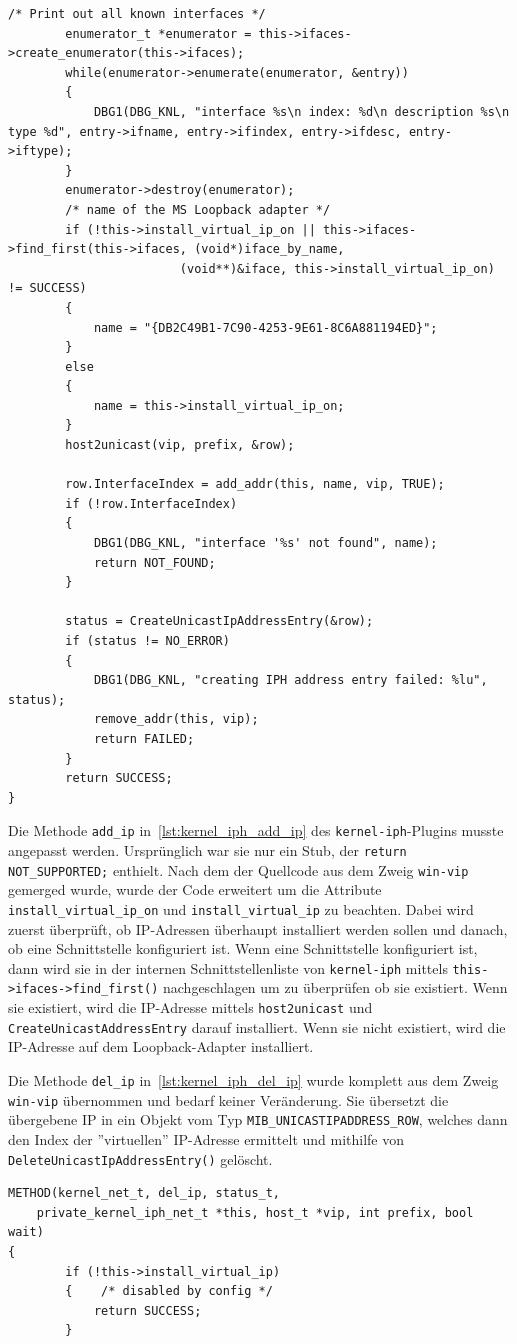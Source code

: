{\begin{lstlisting}[caption=Code für add\_ip,label=lst:kernel_iph_add_ip]
        /* Print out all known interfaces */
        enumerator_t *enumerator = this->ifaces->create_enumerator(this->ifaces);
        while(enumerator->enumerate(enumerator, &entry))
        {
            DBG1(DBG_KNL, "interface %s\n index: %d\n description %s\n type %d", entry->ifname, entry->ifindex, entry->ifdesc, entry->iftype);
        }
        enumerator->destroy(enumerator);
        /* name of the MS Loopback adapter */
        if (!this->install_virtual_ip_on || this->ifaces->find_first(this->ifaces, (void*)iface_by_name,
                        (void**)&iface, this->install_virtual_ip_on) != SUCCESS)
        {
            name = "{DB2C49B1-7C90-4253-9E61-8C6A881194ED}";
        }
        else
        {
            name = this->install_virtual_ip_on;
        }
        host2unicast(vip, prefix, &row);

        row.InterfaceIndex = add_addr(this, name, vip, TRUE);
        if (!row.InterfaceIndex)
        {
            DBG1(DBG_KNL, "interface '%s' not found", name);
            return NOT_FOUND;
        }

        status = CreateUnicastIpAddressEntry(&row);
        if (status != NO_ERROR)
        {
            DBG1(DBG_KNL, "creating IPH address entry failed: %lu", status);
            remove_addr(this, vip);
            return FAILED;
        }
        return SUCCESS;
}
\end{lstlisting}

Die Methode \texttt{add\_ip} in~\autoref{lst:kernel_iph_add_ip} des \texttt{kernel-iph}-Plugins musste angepasst werden.
Ursprünglich war sie nur ein Stub, der \texttt{return NOT\_SUPPORTED;} enthielt.
Nach dem der Quellcode aus dem Zweig \texttt{win-vip} gemerged wurde, wurde der Code erweitert
um die Attribute \texttt{install\_virtual\_ip\_on} und \texttt{install\_virtual\_ip} zu beachten.
Dabei wird zuerst überprüft, ob \ac{IP}-Adressen überhaupt installiert werden
sollen und danach, ob eine Schnittstelle konfiguriert ist.
Wenn eine Schnittstelle konfiguriert ist, dann wird sie in der internen
Schnittstellenliste von \texttt{kernel-iph} mittels \texttt{this->ifaces->find\_first()}
nachgeschlagen um zu überprüfen ob sie existiert. Wenn sie existiert,
wird die \ac{IP}-Adresse mittels \texttt{host2unicast} und
\texttt{CreateUnicastAddressEntry} darauf installiert. Wenn sie nicht existiert, 
wird die \ac{IP}-Adresse auf dem Loopback-Adapter installiert.

Die Methode \texttt{del\_ip} in~\autoref{lst:kernel_iph_del_ip} wurde komplett aus dem Zweig \texttt{win-vip} übernommen
und bedarf keiner Veränderung. Sie übersetzt die übergebene IP in ein
Objekt vom Typ \texttt{MIB\_UNICASTIPADDRESS\_ROW}, welches dann den Index der ''virtuellen''
\ac{IP}-Adresse ermittelt und mithilfe von \texttt{DeleteUnicastIpAddressEntry()}
gelöscht.
\begin{lstlisting}[caption=Code für del\_ip,label=lst:kernel_iph_del_ip]
METHOD(kernel_net_t, del_ip, status_t,
    private_kernel_iph_net_t *this, host_t *vip, int prefix, bool wait)
{
        if (!this->install_virtual_ip)
        {    /* disabled by config */
            return SUCCESS;
        }


\end{lstlisting}}

